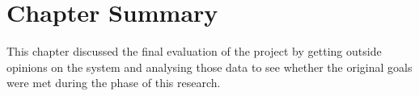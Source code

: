 \section{Chapter Summary}

This chapter discussed the final evaluation of the project by getting outside opinions on the system and analysing those data to see whether the original goals were met during the phase of this research. 
